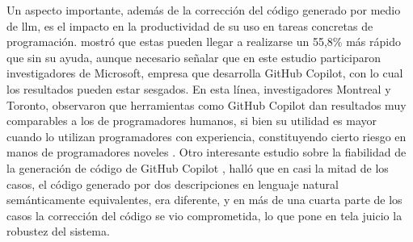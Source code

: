 Un aspecto importante, además de la corrección del código generado por medio de \gls{llm}, es el impacto en la productividad de su uso en tareas concretas de programación. \citep{pengImpactAIDeveloper2023a} mostró que estas pueden llegar a realizarse un 55,8\% más rápido que sin su ayuda, aunque necesario señalar que en este estudio participaron investigadores de Microsoft, empresa que desarrolla {GitHub Copilot}, con lo cual los resultados pueden estar sesgados. En esta línea, investigadores Montreal y Toronto, observaron que herramientas como {GitHub Copilot} dan resultados muy comparables a los de programadores humanos, si bien su utilidad es mayor cuando lo utilizan programadores con experiencia, constituyendo cierto riesgo en manos de programadores noveles \citep{moradidakhelGitHubCopilotAI2023}. Otro interesante estudio sobre la fiabilidad de la generación de código de {GitHub Copilot} \citep{mastropaoloRobustnessCodeGeneration2023}, halló que en casi la mitad de los casos, el código generado por dos descripciones en lenguaje natural semánticamente equivalentes, era diferente, y en más de una cuarta parte de los casos la corrección del código se vio comprometida, lo que pone en tela juicio la robustez del sistema.


